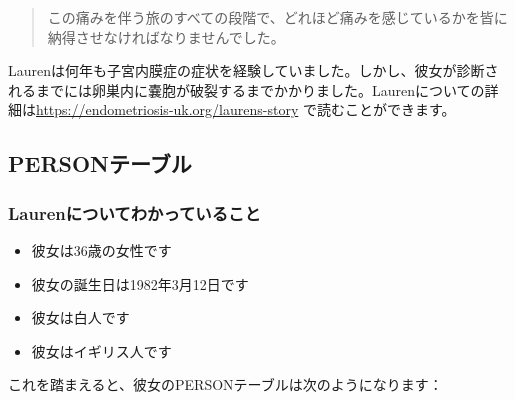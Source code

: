 \documentclass[
  11pt]{book}
\providecommand{\tightlist}{%
  \setlength{\itemsep}{0pt}\setlength{\parskip}{0pt}}
\theoremstyle{definition}
\theoremstyle{definition}
\theoremstyle{definition}
\theoremstyle{definition}
\theoremstyle{remark}
\begin{document}
\begin{quote}
この痛みを伴う旅のすべての段階で、どれほど痛みを感じているかを皆に納得させなければなりませんでした。
\end{quote}

Laurenは何年も子宮内膜症の症状を経験していました。しかし、彼女が診断されるまでには卵巣内に嚢胞が破裂するまでかかりました。Laurenについての詳細は\url{https://endometriosis-uk.org/laurens-story} で読むことができます。

\subsection{PERSONテーブル}\label{person}

\subsubsection*{Laurenについてわかっていること}\label{laurenux306bux3064ux3044ux3066ux308fux304bux3063ux3066ux3044ux308bux3053ux3068}

\begin{itemize}
\tightlist
\item
  彼女は36歳の女性です
\item
  彼女の誕生日は1982年3月12日です
\item
  彼女は白人です
\item
  彼女はイギリス人です
\end{itemize}

これを踏まえると、彼女のPERSONテーブルは次のようになります：
\end{document}

